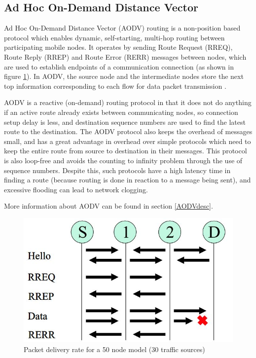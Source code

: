 \subsection{Ad Hoc On-Demand Distance Vector}
Ad Hoc On-Demand Distance Vector (AODV) routing is a non-position based protocol which enables dynamic, self-starting, multi-hop routing between participating mobile nodes. It operates by sending Route Request (RREQ), Route Reply (RREP) and Route Error (RERR) messages between nodes, which are used to establish endpoints of a communication connection (as shown in figure \ref{aodv}).  In AODV, the source node and the intermediate nodes store the next top information corresponding to each flow for data packet transmission \cite{perkins2003}.

AODV is a reactive (on-demand) routing protocol in that it does not do anything if an active route already exists between communicating nodes, so connection setup delay is less, and destination sequence numbers are used to find the latest route to the destination. The AODV protocol also keeps the overhead of messages small, and has a great advantage in overhead over simple protocols which need to keep the entire route from source to destination in their messages. This protocol is also loop-free and avoids the counting to infinity problem through the use of sequence numbers. Despite this, such protocols have a high latency time in finding a route (because routing is done in reaction to a message being sent), and excessive flooding can lead to network clogging. 

More information about AODV can be found in section \ref{AODVdesc}.

\begin{figure}
	\centering	
	\includegraphics[scale=0.7]{img/aodv}
	\caption{Packet delivery rate for a 50 node model (30 traffic sources)\cite{chakeres2004aodv}}
	\label{aodv}
\end{figure}


